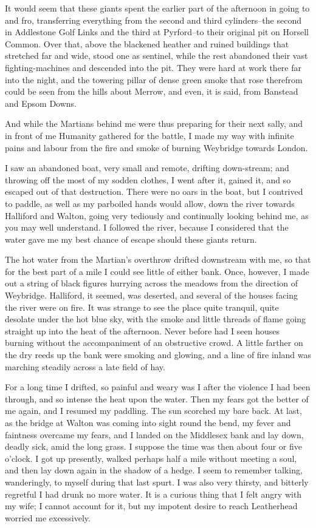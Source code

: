 It would seem that these giants spent the earlier part of the
afternoon in going to and fro, transferring everything from the
second and third cylinders--the second in Addlestone Golf Links and
the third at Pyrford--to their original pit on Horsell Common. Over
that, above the blackened heather and ruined buildings that
stretched far and wide, stood one as sentinel, while the rest
abandoned their vast fighting-machines and descended into the pit.
They were hard at work there far into the night, and the towering
pillar of dense green smoke that rose therefrom could be seen from
the hills about Merrow, and even, it is said, from Banstead and
Epsom Downs.

And while the Martians behind me were thus preparing for their next
sally, and in front of me Humanity gathered for the battle, I made
my way with infinite pains and labour from the fire and smoke of
burning Weybridge towards London.

I saw an abandoned boat, very small and remote, drifting
down-stream; and throwing off the most of my sodden clothes, I went
after it, gained it, and so escaped out of that destruction. There
were no oars in the boat, but I contrived to paddle, as well as my
parboiled hands would allow, down the river towards Halliford and
Walton, going very tediously and continually looking behind me, as
you may well understand. I followed the river, because I considered
that the water gave me my best chance of escape should these giants
return.

The hot water from the Martian's overthrow drifted downstream with
me, so that for the best part of a mile I could see little of
either bank. Once, however, I made out a string of black figures
hurrying across the meadows from the direction of Weybridge.
Halliford, it seemed, was deserted, and several of the houses
facing the river were on fire. It was strange to see the place
quite tranquil, quite desolate under the hot blue sky, with the
smoke and little threads of flame going straight up into the heat
of the afternoon. Never before had I seen houses burning without
the accompaniment of an obstructive crowd. A little farther on the
dry reeds up the bank were smoking and glowing, and a line of fire
inland was marching steadily across a late field of hay.

For a long time I drifted, so painful and weary was I after the
violence I had been through, and so intense the heat upon the
water. Then my fears got the better of me again, and I resumed my
paddling. The sun scorched my bare back. At last, as the bridge at
Walton was coming into sight round the bend, my fever and faintness
overcame my fears, and I landed on the Middlesex bank and lay down,
deadly sick, amid the long grass. I suppose the time was then about
four or five o'clock. I got up presently, walked perhaps half a
mile without meeting a soul, and then lay down again in the shadow
of a hedge. I seem to remember talking, wanderingly, to myself
during that last spurt. I was also very thirsty, and bitterly
regretful I had drunk no more water. It is a curious thing that I
felt angry with my wife; I cannot account for it, but my impotent
desire to reach Leatherhead worried me excessively.

